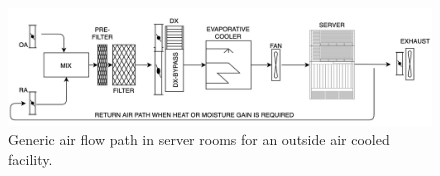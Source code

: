 \begin{figure} [!h]
\centering
\includegraphics[scale=.5]{methodology/images/airflow.png}
\caption[Airflow through DCS]{Generic air flow path in server rooms for an outside air cooled facility.}
\label{img_airflow}
\end{figure}